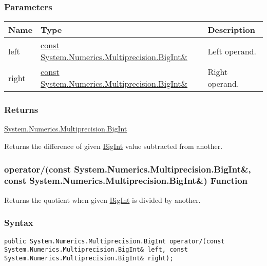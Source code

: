\documentclass[a4paper,oneside,11.000000pt]{book}
\begin{document}
\subsubsection*{Parameters}
\begin{flushleft}
\begin{supertabular}[l]{!{\raggedright}p{1.30721cm}!{\raggedright}p{8.55945cm}!{\raggedright}p{3.66839cm}}
\textbf{Name}
& \textbf{Type}
& \textbf{Description}
\\
\hline
left
& \hyperlink{System.Numerics.Multiprecision.BigInt}{const System.\-Numerics.\-Multiprecision.\-BigInt\&\-}
& Left operand.

\\
right
& \hyperlink{System.Numerics.Multiprecision.BigInt}{const System.\-Numerics.\-Multiprecision.\-BigInt\&\-}
& Right operand.

\\
\end{supertabular}

\end{flushleft}
\subsubsection*{Returns}
\hyperlink{System.Numerics.Multiprecision.BigInt}{System.\-Numerics.\-Multiprecision.\-BigInt}
\begin{flushleft}
Returns the difference of given \hyperlink{System.Numerics.Multiprecision.BigInt}{BigInt} value subtracted from another.

\end{flushleft}
\clearpage

\hypertarget{System.Numerics.Multiprecision.operator.divides.C.R.System.Numerics.Multiprecision.BigInt.C.R.System.Numerics.Multiprecision.BigInt}{\subsubsection*{operator/(const System.Numerics.Multiprecision.BigInt\&, const System.Numerics.Multiprecision.BigInt\&) Function}}
\begin{flushleft}
Returns the quotient when given \hyperlink{System.Numerics.Multiprecision.BigInt}{BigInt} is divided by another.

\end{flushleft}
\subsubsection*{Syntax}
\texttt{public System.Numerics.Multiprecision.BigInt operator/(const System.Numerics.Multiprecision.BigInt\& left, const System.Numerics.Multiprecision.BigInt\& right);}
\end{document}
